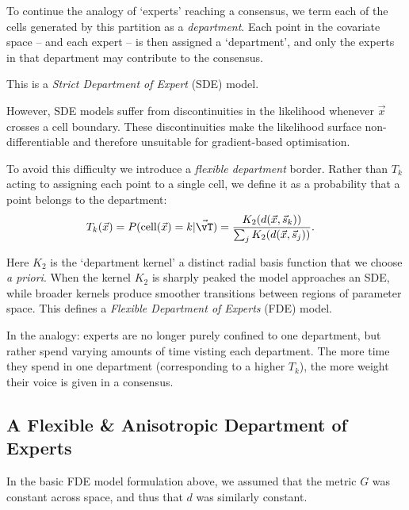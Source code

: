 		\begin{analogy}
			To continue the analogy of `experts' reaching a consensus, we term each of the cells generated by this partition as a \textit{department}. Each point in the covariate space -- and each expert -- is then assigned a `department', and only the experts in that department may contribute to the consensus.
		\end{analogy}

		This is a \textit{Strict Department of Expert} (SDE) model.


		However, SDE models suffer from discontinuities in the likelihood whenever $\vec{x}$ crosses a cell boundary.
		These discontinuities make the likelihood surface non-differentiable and therefore unsuitable for gradient-based optimisation.

		To avoid this difficulty we introduce a \emph{flexible department} border. Rather than $T_k$ acting to assigning each point to a single cell, we define it as a probability that a point belongs to the department:
		\begin{align}
			T_k(\vec{x}) = P(\text{cell}(\vec{x}) = k | \vec{\vT}) & =
			\frac{K_2\!\left(d(\vec{x},\vec{s}_k)\right)}
			{\sum_j K_2\!\left(d(\vec{x},\vec{s}_j)\right)}.
		\end{align}

		Here $K_2$ is the `department kernel' a distinct radial basis function that we choose \textit{a priori}. When the kernel $K_2$ is sharply peaked the model approaches an SDE, while broader kernels produce smoother transitions between regions of parameter space. This defines a \textit{Flexible Department of Experts} (FDE) model.

		\begin{analogy}
			In the analogy: experts are no longer purely confined to one department, but rather spend varying amounts of time visting each department. The more time they spend in one department (corresponding to a higher $T_k$), the more weight their voice is given in a consensus.
		\end{analogy}


	\subsection{A Flexible \& Anisotropic Department of Experts}

		In the basic FDE model formulation above, we assumed that the metric $G$ was constant across space, and thus that $d$ was similarly constant.

